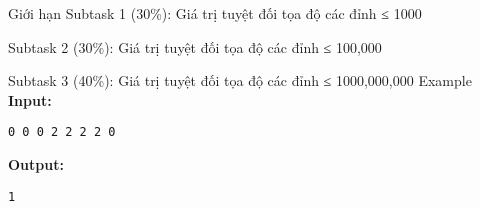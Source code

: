 Giới hạn  
Subtask 1 (30\%): Giá trị tuyệt đối tọa độ các đỉnh ≤ 1000  

   Subtask 2 (30\%): Giá trị tuyệt đối tọa độ các đỉnh ≤ 100,000  

   Subtask 3 (40\%): Giá trị tuyệt đối tọa độ các đỉnh ≤ 1000,000,000
   Example  
\textbf{    Input:   }
\begin{verbatim}
0 0 0 2 2 2 2 0
\end{verbatim}

\textbf{    Output:   }
\begin{verbatim}
1\end{verbatim}